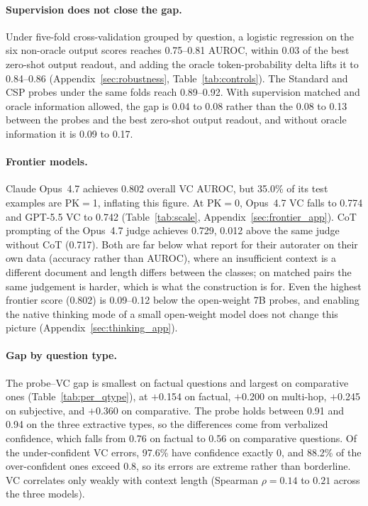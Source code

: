 \documentclass[acmsmall,screen,review]{acmart}
\begin{document}
\paragraph{Supervision does not close the gap.}
Under five-fold cross-validation grouped by question, a logistic regression on the six non-oracle output scores reaches 0.75--0.81 AUROC, within 0.03 of the best zero-shot output readout, and adding the oracle token-probability delta lifts it to 0.84--0.86 (Appendix~\ref{sec:robustness}, Table~\ref{tab:controls}). The Standard and CSP probes under the same folds reach 0.89--0.92. With supervision matched and oracle information allowed, the gap is 0.04 to 0.08 rather than the 0.08 to 0.13 between the probes and the best zero-shot output readout, and without oracle information it is 0.09 to 0.17.

\paragraph{Frontier models.}
Claude Opus~4.7 achieves 0.802 overall VC AUROC, but 35.0\% of its test examples are PK$=$1, inflating this figure. At PK$=$0, Opus~4.7 VC falls to 0.774 and GPT-5.5 VC to 0.742 (Table~\ref{tab:scale}, Appendix~\ref{sec:frontier_app}). CoT prompting of the Opus~4.7 judge achieves 0.729, 0.012 above the same judge without CoT (0.717). Both are far below what \citet{joren2025sufficient} report for their autorater on their own data (accuracy rather than AUROC), where an insufficient context is a different document and length differs between the classes; on matched pairs the same judgement is harder, which is what the construction is for. Even the highest frontier score (0.802) is 0.09--0.12 below the open-weight 7B probes, and enabling the native thinking mode of a small open-weight model does not change this picture (Appendix~\ref{sec:thinking_app}).

\paragraph{Gap by question type.}
The probe--VC gap is smallest on factual questions and largest on comparative ones (Table~\ref{tab:per_qtype}), at $+$0.154 on factual, $+$0.200 on multi-hop, $+$0.245 on subjective, and $+$0.360 on comparative. The probe holds between 0.91 and 0.94 on the three extractive types, so the differences come from verbalized confidence, which falls from 0.76 on factual to 0.56 on comparative questions. Of the under-confident VC errors, 97.6\% have confidence exactly 0, and 88.2\% of the over-confident ones exceed 0.8, so its errors are extreme rather than borderline. VC correlates only weakly with context length (Spearman $\rho = 0.14$ to $0.21$ across the three models).
\end{document}
